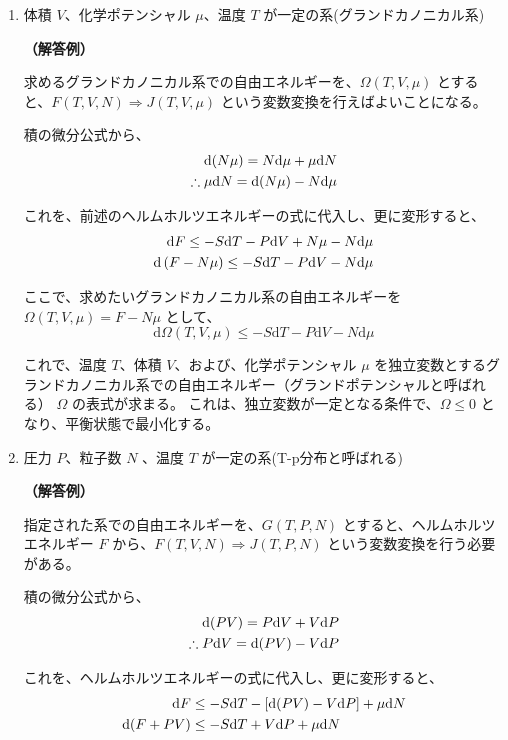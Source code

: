 \documentclass[uplatex,dvipdfmx,a4paper,11pt]{jsarticle}
\newcommand{\diff}{\mathrm d}
\begin{document}
\begin{appendix}
\begin{enumerate}
\begin{enumerate}
\item
体積 $V$、化学ポテンシャル $\mu$、温度 $T$ が一定の系(グランドカノニカル系)

{\bf （解答例）}

求めるグランドカノニカル系での自由エネルギーを、$\Omega(T, V, \mu)$ とすると、$F(T, V, N) \Rightarrow J(T, V, \mu)$ という変数変換を行えばよいことになる。

積の微分公式から、
\begin{align*}
\diff (N \mu) = N \diff \mu + \mu \diff N \notag \\
\therefore \mu \diff N = \diff (N \mu) - N \diff \mu
\end{align*}
	 	
これを、前述のヘルムホルツエネルギーの式に代入し、更に変形すると、
\begin{align*}
\diff F \leq -S \diff T - P \diff V + N \mu - N \diff \mu \notag \\
\diff \left(F - N \mu \right) \leq -S \diff T - P \diff V - N \diff \mu
\end{align*}

ここで、求めたいグランドカノニカル系の自由エネルギーを $\Omega(T,V,\mu) = F - N \mu$ として、
\begin{equation*}
\diff \Omega(T,V,\mu) \leq -S \diff T - P \diff V - N \diff \mu
\end{equation*}
	 	
これで、温度 $T$、体積 $V$、および、化学ポテンシャル $\mu$ を独立変数とするグランドカノニカル系での自由エネルギー（グランドポテンシャルと呼ばれる） $\Omega$ の表式が求まる。
これは、独立変数が一定となる条件で、$\Omega \leq 0$ となり、平衡状態で最小化する。

\item
圧力 $P$、粒子数 $N$ 、温度 $T$ が一定の系(T-p分布と呼ばれる)

{\bf （解答例）}

指定された系での自由エネルギーを、$G(T, P, N)$ とすると、ヘルムホルツエネルギー $F$ から、$F(T, V, N) \Rightarrow J(T, P, N)$ という変数変換を行う必要がある。

積の微分公式から、
\begin{align*}
\diff (PV) = P \diff V + V \diff P \notag \\
\therefore  P \diff V = \diff (PV) - V \diff P
\end{align*}
	 	
これを、ヘルムホルツエネルギーの式に代入し、更に変形すると、
\begin{align*}
\diff F &\leq -S \diff T - [\diff (PV) -V \diff P] + \mu \diff N \notag \\
\diff (F + PV) &\leq -S \diff T + V \diff P + \mu \diff N
\end{align*}


\end{enumerate}
\end{enumerate}
\end{appendix}
\end{document}
